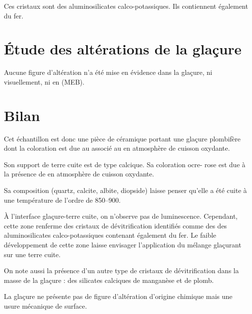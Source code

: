 Ces cristaux sont des aluminosilicates calco-potassiques. Ils 
contiennent également du fer.


\section{Étude des altérations de la glaçure}

Aucune figure d'altération n'a été mise en évidence dans la glaçure, 
ni visuellement, ni en \MEB[ie] (MEB).


\section{Bilan}

Cet échantillon est donc une pièce de céramique portant une glaçure 
plombifère dont la coloration  est due au  
associé au  en atmosphère de cuisson oxydante.

Son support de terre cuite est de type calcique. Sa coloration ocre-
rose est due à la présence de  en atmosphère de cuisson 
oxydante.

Sa composition \cristallo (quartz, calcite, albite, diopside) 
laisse penser qu'elle a été cuite à une température de l'ordre de 
\SIrange[range-phrase=\ à\ ]{850}{900}{\degC}.

À l'interface glaçure-terre cuite, on n'observe pas de luminescence. 
Cependant, cette zone renferme des cristaux de dévitrification 
identifiés comme des des aluminosilicates calco-potassiques contenant 
également du fer. Le faible développement de cette zone laisse 
envisager l'application du mélange glaçurant sur une terre cuite.

On note aussi la présence d'un autre type de cristaux de 
dévitrification dans la masse de la glaçure : des silicates calciques 
de manganèse et de plomb.

La glaçure ne présente pas de figure d'altération d'origine chimique 
mais une usure mécanique de surface.
